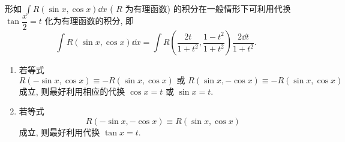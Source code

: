 \begin{theorem}[三角函数换元及万能公式]
    形如 $ \displaystyle\int R(\sin x, \cos x) \dd  x $ ( $ R $ 为有理函数) 的积分在一般情形下可利用代换 $ \tan \dfrac{x}{2}=t $ 化为有理函数的积分, 即
    $$\int R(\sin x, \cos x) \dd  x=\int R\left(\frac{2 t}{1+t^{2}}, \frac{1-t^{2}}{1+t^{2}}\right) \frac{2 \dd  t}{1+t^{2}}.$$
    \begin{enumerate}[label=(\arabic{*})]
        \item 若等式 $$R(-\sin x, \cos x) \equiv-R(\sin x, \cos x) \text { 或 } R(\sin x,-\cos x) \equiv-R(\sin x, \cos x)$$
              成立, 则最好利用相应的代换 $ \cos x=t $ 或 $ \sin x=t .$
        \item 若等式 $$R(-\sin x,-\cos x) \equiv R(\sin x, \cos x)$$ 成立, 则最好利用代换 $ \tan x=t .$
    \end{enumerate}
\end{theorem}

